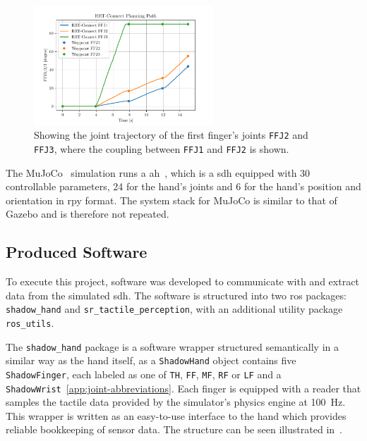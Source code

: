 \begin{figure}[h]
		\begin{center}
			\includegraphics[width=0.6\textwidth]{chapters/system-setup/fig/q-angles.pdf}
		\end{center}
		\caption{Showing the joint trajectory of the first finger's joints \texttt{FFJ2} and \texttt{FFJ3}, where the coupling between \texttt{FFJ1} and \texttt{FFJ2} is shown.}
		\label{fig:coupling-and-planning-graph}
\end{figure}

The MuJoCo~\cite{todorov2012mujoco} simulation runs a \gls{ah}~\cite{learning-complex-dexterous-manipulation-with-deep-reinforcement-learning-and-demonstrations}, which is a \gls{sdh} equipped with \num{30} controllable parameters, \num{24} for the hand's joints and \num{6} for the hand's position  and orientation  in \gls{rpy} format. The system stack for MuJoCo is similar to that of Gazebo and is therefore not repeated. \medskip


\subsection{Produced Software}\label{sec:system-setup-simulation-setup-produced}

To execute this project, software was developed to communicate with and extract data from the simulated \gls{sdh}. The software is structured into two \gls{ros} packages: \texttt{shadow\_hand} and \texttt{sr\_tactile\_perception}, with an additional utility package \texttt{ros\_utils}. \medskip

The \texttt{shadow\_hand} package is a software wrapper structured semantically in a similar way as the hand itself, as a \texttt{ShadowHand} object contains five \texttt{ShadowFinger}, each labeled as one of \texttt{TH}, \texttt{FF}, \texttt{MF}, \texttt{RF} or \texttt{LF} and a \texttt{ShadowWrist}~\ref{app:joint-abbreviations}. Each finger is equipped with a reader that samples the tactile data provided by the simulator's physics engine at \SI{100}{\hertz}. This wrapper is written as an easy-to-use interface to the hand which provides reliable bookkeeping of sensor data. The structure can be seen illustrated in~. \medskip

